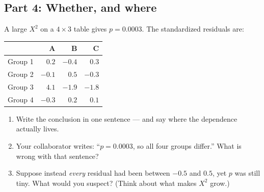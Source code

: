 \documentclass{article}
\begin{document}
\subsection*{Part 4: Whether, and where}
A large $X^2$ on a $4 \times 3$ table gives $p = 0.0003$. The standardized residuals are:

\begin{center}
\renewcommand{\arraystretch}{1.2}
\begin{tabular}{lrrr}
\toprule
& A & B & C \\
\midrule
Group 1 & $0.2$ & $-0.4$ & $0.3$ \\
Group 2 & $-0.1$ & $0.5$ & $-0.3$ \\
Group 3 & $\mathbf{4.1}$ & $-1.9$ & $-1.8$ \\
Group 4 & $-0.3$ & $0.2$ & $0.1$ \\
\bottomrule
\end{tabular}
\end{center}

\begin{enumerate}[label={\bfseries (\Alph*)},itemsep=.8em]
\item Write the conclusion in one sentence --- and say where the dependence actually lives. \\[3.5em]
\item Your collaborator writes: ``$p = 0.0003$, so all four groups differ.'' What is wrong with that sentence? \\[3.5em]
\item Suppose instead \emph{every} residual had been between $-0.5$ and $0.5$, yet $p$ was still tiny. What would you suspect? (Think about what makes $X^2$ grow.) \\[3.5em]
\end{enumerate}
\end{document}
